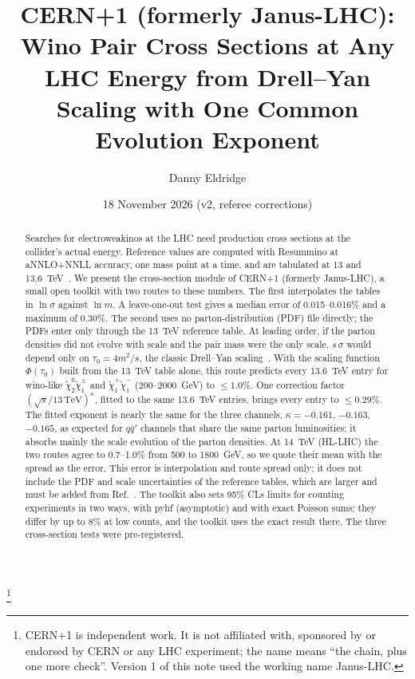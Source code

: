 \documentclass[aps,prd,twocolumn,superscriptaddress,nofootinbib,showkeys]{revtex4-2}
\begin{document}
\title{CERN+1 (formerly Janus-LHC): Wino Pair Cross Sections at Any LHC Energy from Drell--Yan Scaling with One Common Evolution Exponent}
\author{Danny Eldridge}
\thanks{CERN+1 is independent work. It is not affiliated with, sponsored by or endorsed by CERN or any LHC experiment; the name means ``the chain, plus one more check''. Version 1 of this note used the working name Janus-LHC.}
\date{18 November 2026 (v2, referee corrections)}
\begin{abstract}
Searches for electroweakinos at the LHC need production cross sections at the collider's actual energy. Reference values are computed with Resummino at aNNLO+NNLL accuracy, one mass point at a time, and are tabulated at 13 and 13.6~TeV~\cite{Res}. We present the cross-section module of CERN+1 (formerly Janus-LHC), a small open toolkit with two routes to these numbers. The first interpolates the tables in $\ln\sigma$ against $\ln m$. A leave-one-out test gives a median error of 0.015--0.016\% and a maximum of 0.30\%. The second uses no parton-distribution (PDF) file directly; the PDFs enter only through the 13~TeV reference table. At leading order, if the parton densities did not evolve with scale and the pair mass were the only scale, $s\,\sigma$ would depend only on $\tau_0=4m^2/s$, the classic Drell--Yan scaling~\cite{DY}. With the scaling function $\Phi(\tau_0)$ built from the 13~TeV table alone, this route predicts every 13.6~TeV entry for wino-like $\tilde\chi_2^0\tilde\chi_1^\pm$ and $\tilde\chi_1^+\tilde\chi_1^-$ (200--2000~GeV) to $\le1.0\%$. One correction factor $(\sqrt s/13\,\mathrm{TeV})^{\kappa}$, fitted to the same 13.6~TeV entries, brings every entry to $\le0.29\%$. The fitted exponent is nearly the same for the three channels, $\kappa=-0.161$, $-0.163$, $-0.165$, as expected for $q\bar q'$ channels that share the same parton luminosities; it absorbs mainly the scale evolution of the parton densities. At 14~TeV (HL-LHC) the two routes agree to 0.7--1.0\% from 500 to 1800~GeV, so we quote their mean with the spread as the error. This error is interpolation and route spread only; it does not include the PDF and scale uncertainties of the reference tables, which are larger and must be added from Ref.~\cite{Res}. The toolkit also sets 95\% CLs limits for counting experiments in two ways, with pyhf (asymptotic) and with exact Poisson sums; they differ by up to 8\% at low counts, and the toolkit uses the exact result there. The three cross-section tests were pre-registered.
\end{abstract}
\maketitle
\end{document}
